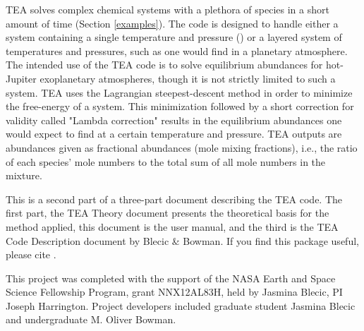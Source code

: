   TEA solves complex chemical systems with a plethora of species in a
  short amount of time (Section \ref{examples}).  The code is designed
  to handle either a system containing a single temperature and
  pressure () or a layered system of temperatures and
  pressures, such as one would find in a planetary atmosphere.  The
  intended use of the TEA code is to solve equilibrium abundances for
  hot-Jupiter exoplanetary atmospheres, though it is not strictly
  limited to such a system. TEA uses the Lagrangian steepest-descent
  method \citep[Section 1.2] {BlecicEtal2016-TEAtheory} in order to
  minimize the free-energy of a system.  This minimization followed by
  a short correction for validity called "Lambda
  correction" \citep[Section 4]{BlecicEtal2016-TEAtheory} results in
  the equilibrium abundances one would expect to find at a certain
  temperature and pressure. TEA outputs are abundances given as
  fractional abundances (mole mixing fractions), i.e., the ratio of
  each species' mole numbers to the total sum of all mole numbers in
  the mixture.


This is a second part of a three-part document describing the TEA
code. The first part, the TEA Theory document
\citep{BlecicEtal2016-TEAtheory} presents the theoretical basis for
the method applied, this document is the user manual, and the third is
the TEA Code Description document by Blecic \& Bowman. If you find
this package useful, please cite \citet{BlecicEtal2016-TEAtheory}.


  This project was completed with the support of the NASA Earth and
  Space Science Fellowship Program, grant NNX12AL83H, held by Jasmina
  Blecic, PI Joseph Harrington. Project developers included graduate
  student Jasmina Blecic and undergraduate M. Oliver Bowman.


